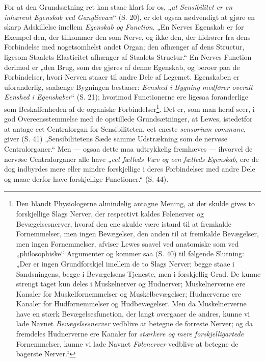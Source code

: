 \documentclass[12pt,a4paper]{book}
\begin{document}
For at den Grundsætning ret kan staae klart for os, „\emph{at
Sensibilitet er en inhærent Egenskab ved Ganglievæv}“ (S. 20), er det
ogsaa nødvendigt at gjøre en skarp Adskillelse imellem \emph{Egenskab og
Function}. „En Nerves Egenskab er for Exempel den, der tilkommer den som
Nerve, og ikke den, der hidrører fra dens Forbindelse med
nogetsomhelst andet Organ; den afhænger af dens Structur, ligesom
Staalets Elasticitet afhænger af Staalets Structur.“ En Nerves Function
derimod er „den Brug, som der gjøres af denne Egenskab, og beroer paa de
Forbindelser, hvori Nerven staaer til andre Dele af Legemet. Egenskaben
er uforanderlig, saalænge Bygningen bestaaer: \emph{Eenshed i Bygning
medfører overalt Eenshed i Egenskaber}“ (S. 21); hvorimod Functionerne
ere ligesaa foranderlige som Beskaffenheden af de organiske
Forbindelser\footnote{Den blandt Physiologerne almindelig antagne
Mening, at der skulde gives to forskjellige Slags Nerver, der respectivt
kaldes Følenerver og Bevægelsesnerver, hvoraf den ene skulde være istand
til at fremkalde Fornemmelser, men ingen Bevægelser, den anden til at
fremkalde Bevægelser, men ingen Fornemmelser, afviser Lewes saavel ved
anatomiske som ved „philosophiske“ Argumenter og kommer saa (S. 40) til
følgende Slutning: „Der er ingen Grundforskjel imellem de to Slags
Nerver; begge staae i Sandsningens, begge i Bevægelsens Tjeneste, men i
forskjellig Grad. De kunne strengt taget kun deles i Muskelnerver og
Hudnerver; Muskelnerverne ere Kanaler for Muskelfornemmelser og
Muskelbevægelser; Hudnerverne ere Kanaler for Hudfornemmelser og
Hudbevægelser. Men da Muskelnerverne have en stærk Bevægelsesfunction,
der langt overgaaer de andres, kunne vi lade Navnet
\emph{Bevægelsesnerver} vedblive at betegne de forreste Nerver; og da
fremdeles Hudnerverne ere Kanaler for \emph{stærkere og mere
forskjelligartede} Fornemmelser, kunne vi lade Navnet \emph{Følenerver}
vedblive at betegne de bagerste Nerver.“}.
Det er, som man heraf seer, i god Overeensstemmelse med de opstillede
Grundsætninger, at Lewes, istedetfor at antage eet Centralorgan for
Sensibiliteten, eet eneste \textit{sensorium commune}, giver (S. 41)
„Sensibilitetens Sæde samme Udstrækning som de nervøse Centralorganer.“
Men --- ogsaa dette maa udtrykkelig fremhæves --- ihvorvel de nervøse
Centralorganer alle have „\emph{eet fælleds Væv og een fælleds
Egenskab}, ere de dog indbyrdes mere eller mindre forskjellige i deres
Forbindelser med andre Dele og maae derfor have forskjellige
Functioner.“ (S. 44).
\end{document}
